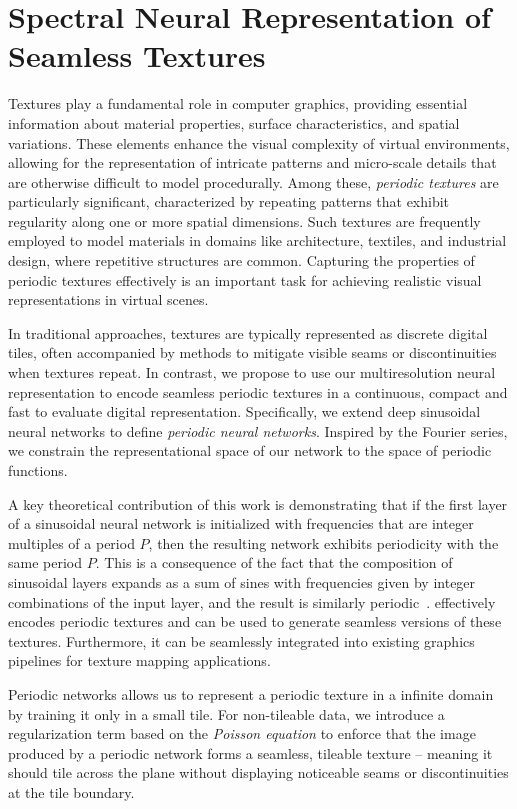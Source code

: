 \chapter{Spectral Neural Representation of Seamless Textures}
\label{chap:seamless-textures}

Textures play a fundamental role in computer graphics, providing essential information about material properties, surface characteristics, and spatial variations. These elements enhance the visual complexity of virtual environments, allowing for the representation of intricate patterns and micro-scale details that are otherwise difficult to model procedurally. Among these, \textit{periodic textures} are particularly significant, characterized by repeating patterns that exhibit regularity along one or more spatial dimensions. Such textures are frequently employed to model materials in domains like architecture, textiles, and industrial design, where repetitive structures are common. Capturing the properties of periodic textures effectively is an important task for achieving realistic visual representations in virtual scenes.

In traditional approaches, textures are typically represented as discrete digital tiles, often accompanied by methods to mitigate visible seams or discontinuities when textures repeat. In contrast, we propose to use our multiresolution neural representation to encode seamless periodic textures in a continuous, compact and fast to evaluate digital representation. Specifically, we extend deep sinusoidal neural networks to define \textit{periodic neural networks}. Inspired by the Fourier series, we constrain the representational space of our network to the space of periodic functions.

A key theoretical contribution of this work is demonstrating that if the first layer of a sinusoidal neural network is initialized with frequencies that are integer multiples of a period $P$, then the resulting network exhibits periodicity with the same period $P$. This is a consequence of the fact that the composition of sinusoidal layers expands as a sum of sines with frequencies given by integer combinations of the input layer, and the result is similarly periodic~\citep{novello2022understanding, yuce2022structured}. effectively encodes periodic textures and can be used to generate seamless versions of these textures. Furthermore, it can be seamlessly integrated into existing graphics pipelines for texture mapping applications.

Periodic networks allows us to represent a periodic texture in a infinite domain by training it only in a small tile. For non-tileable data, we introduce a regularization term based on the \textit{Poisson equation} to enforce that the image produced by a periodic network forms a seamless, tileable texture -- meaning it should tile across the plane without displaying noticeable seams or discontinuities at the tile boundary. 


